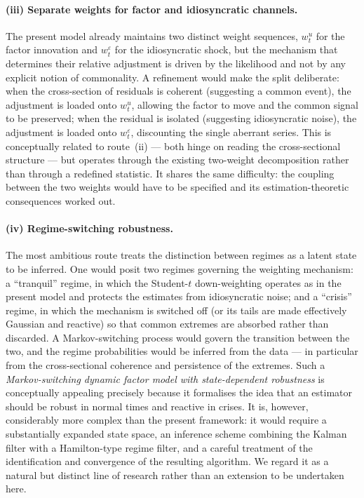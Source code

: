 \documentclass[11pt, a4paper, oneside]{article}
\begin{document}
\paragraph{(iii) Separate weights for factor and idiosyncratic
channels.}
The present model already maintains two distinct weight sequences,
$w^u_t$ for the factor innovation and $w^\varepsilon_t$ for the
idiosyncratic shock, but the mechanism that determines their
relative adjustment is driven by the likelihood and not by any
explicit notion of commonality. A refinement would make the split
deliberate: when the cross-section of residuals is coherent
(suggesting a common event), the adjustment is loaded onto $w^u_t$,
allowing the factor to move and the common signal to be preserved;
when the residual is isolated (suggesting idiosyncratic noise), the
adjustment is loaded onto $w^\varepsilon_t$, discounting the single
aberrant series. This is conceptually related to route~(ii) ---
both hinge on reading the cross-sectional structure --- but
operates through the existing two-weight decomposition rather than
through a redefined statistic. It shares the same difficulty: the
coupling between the two weights would have to be specified and its
estimation-theoretic consequences worked out.

\paragraph{(iv) Regime-switching robustness.}
The most ambitious route treats the distinction between regimes as
a latent state to be inferred. One would posit two regimes governing
the weighting mechanism: a ``tranquil'' regime, in which the
Student-$t$ down-weighting operates as in the present model and
protects the estimates from idiosyncratic noise; and a ``crisis''
regime, in which the mechanism is switched off (or its tails are
made effectively Gaussian and reactive) so that common extremes are
absorbed rather than discarded. A Markov-switching process would
govern the transition between the two, and the regime probabilities
would be inferred from the data --- in particular from the
cross-sectional coherence and persistence of the extremes. Such a
\emph{Markov-switching dynamic factor model with state-dependent
robustness} is conceptually appealing precisely because it
formalises the idea that an estimator should be robust in normal
times and reactive in crises. It is, however, considerably more
complex than the present framework: it would require a substantially
expanded state space, an inference scheme combining the Kalman
filter with a Hamilton-type regime filter, and a careful treatment
of the identification and convergence of the resulting algorithm. We
regard it as a natural but distinct line of research rather than an
extension to be undertaken here.
\end{document}
